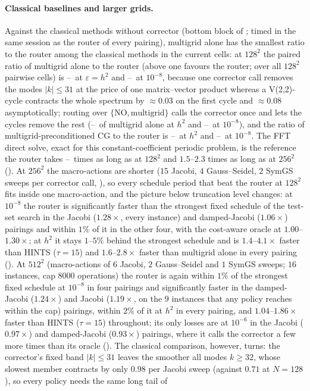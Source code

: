 \paragraph{Classical baselines and larger grids.} Against the classical methods without corrector (bottom block of ; timed in the same session as the router of every pairing), multigrid alone has the smallest ratio to the router among the classical methods in the current cells: at $128^2$ the paired ratio of multigrid alone to the router (above one favours the router; over all $128^2$ pairwise cells) is \caVsMgAllMin--\caVsMgAllMax\ at $\varepsilon = h^2$ and \caVsMgDeepMin--\caVsMgDeepMax\ at $10^{-8}$, because one corrector call removes the modes $|k|\le 31$ at the price of one matrix--vector product whereas a V(2,2)-cycle contracts the whole spectrum by $\approx 0.03$ on the first cycle and $\approx 0.08$ asymptotically; routing over $\{\mathrm{NO}, \text{multigrid}\}$ calls the corrector once and lets the cycles remove the rest (\caVsMgEnsAllMin--\caVsMgEnsAllMax\ of multigrid alone at $h^2$ and \caVsMgEnsDeepMin--\caVsMgEnsDeepMax\ at $10^{-8}$), and the ratio of multigrid-preconditioned CG to the router is \caVsKrylovAllMin--\caVsKrylovAllMax\ at $h^2$ and \caVsKrylovDeepMin--\caVsKrylovDeepMax\ at $10^{-8}$. The FFT direct solve, exact for this constant-coefficient periodic problem, is the reference the router takes \caFftRatioMin--\caFftRatioMax\ times as long as at $128^2$ and $1.5$--$2.3$ times as long as at $256^2$ (). At $256^2$ the macro-actions are shorter ($15$ Jacobi, $4$ Gauss--Seidel, $2$ SymGS sweeps per corrector call, ), so every schedule period that beat the router at $128^2$ fits inside one macro-action, and the picture below truncation level changes: at $10^{-8}$ the router is significantly faster than the strongest fixed schedule of the test-set search in the Jacobi ($1.28\times$, every instance) and damped-Jacobi ($1.06\times$) pairings and within $1\%$ of it in the other four, with the cost-aware oracle at $1.00$--$1.30\times$; at $h^2$ it stays $1$--$5\%$ behind the strongest schedule and is $1.4$--$4.1\times$ faster than HINTS ($\tau{=}15$) and $1.6$--$2.8\times$ faster than multigrid alone in every pairing (). At $512^2$ (macro-actions of $6$ Jacobi, $2$ Gauss--Seidel and $1$ SymGS sweeps; $16$ instances, cap $8000$ operations) the router is again within $1\%$ of the strongest fixed schedule at $10^{-8}$ in four pairings and significantly faster in the damped-Jacobi ($1.24\times$) and Jacobi ($1.19\times$, on the $9$ instances that any policy reaches within the cap) pairings, within $2\%$ of it at $h^2$ in every pairing, and $1.04$--$1.86\times$ faster than HINTS ($\tau{=}15$) throughout; its only losses are at $10^{-6}$ in the Jacobi ($0.97\times$) and damped-Jacobi ($0.93\times$) pairings, where it calls the corrector a few more times than its oracle (). The classical comparison, however, turns: the corrector's fixed band $|k|\le 31$ leaves the smoother all modes $k \ge 32$, whose slowest member contracts by only $0.98$ per Jacobi sweep (against $0.71$ at $N=128$), so every policy needs the same long tail of 